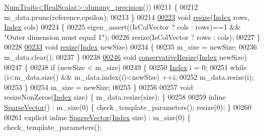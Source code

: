 \begin{DoxyCode}
      \hyperlink{group___core___module_struct_eigen_1_1_num_traits}{NumTraits<RealScalar>::dummy\_precision}())
00211     \{
00212       m\_data.prune(reference,epsilon);
00213     \}
00214 
\hyperlink{group___sparse_core___module_a2dc842b3bb2ba3692e210565c48aff3c}{00223}     \textcolor{keywordtype}{void} \hyperlink{group___sparse_core___module_a2dc842b3bb2ba3692e210565c48aff3c}{resize}(\hyperlink{group___core___module_a554f30542cc2316add4b1ea0a492ff02}{Index} rows, \hyperlink{group___core___module_a554f30542cc2316add4b1ea0a492ff02}{Index} cols)
00224     \{
00225       eigen\_assert((IsColVector ? cols : rows)==1 && \textcolor{stringliteral}{"Outer dimension must equal 1"});
00226       resize(IsColVector ? rows : cols);
00227     \}
00228 
\hyperlink{group___sparse_core___module_a1020011c75fb70b21257c8d04ee07514}{00233}     \textcolor{keywordtype}{void} \hyperlink{group___sparse_core___module_a1020011c75fb70b21257c8d04ee07514}{resize}(\hyperlink{group___core___module_a554f30542cc2316add4b1ea0a492ff02}{Index} newSize)
00234     \{
00235       m\_size = newSize;
00236       m\_data.clear();
00237     \}
00238 
\hyperlink{group___sparse_core___module_ab8dbb1f73b6250c10c0860eb13ca5cca}{00246}     \textcolor{keywordtype}{void} \hyperlink{group___sparse_core___module_ab8dbb1f73b6250c10c0860eb13ca5cca}{conservativeResize}(\hyperlink{group___core___module_a554f30542cc2316add4b1ea0a492ff02}{Index} newSize)
00247     \{
00248       \textcolor{keywordflow}{if} (newSize < m\_size)
00249       \{
00250         \hyperlink{group___core___module_a554f30542cc2316add4b1ea0a492ff02}{Index} i = 0;
00251         \textcolor{keywordflow}{while} (i<m\_data.size() && m\_data.index(i)<newSize) ++i;
00252         m\_data.resize(i);
00253       \}
00254       m\_size = newSize;
00255     \}
00256 
00257     \textcolor{keywordtype}{void} resizeNonZeros(\hyperlink{group___core___module_a554f30542cc2316add4b1ea0a492ff02}{Index} size) \{ m\_data.resize(size); \}
00258 
00259     \textcolor{keyword}{inline} \hyperlink{group___sparse_core___module_class_eigen_1_1_sparse_vector}{SparseVector}() : m\_size(0) \{ check\_template\_parameters(); resize(0); \}
00260 
00261     \textcolor{keyword}{explicit} \textcolor{keyword}{inline} \hyperlink{group___sparse_core___module_class_eigen_1_1_sparse_vector}{SparseVector}(\hyperlink{group___core___module_a554f30542cc2316add4b1ea0a492ff02}{Index} size) : m\_size(0) \{ check\_template\_parameters(); 

\end{DoxyCode}
